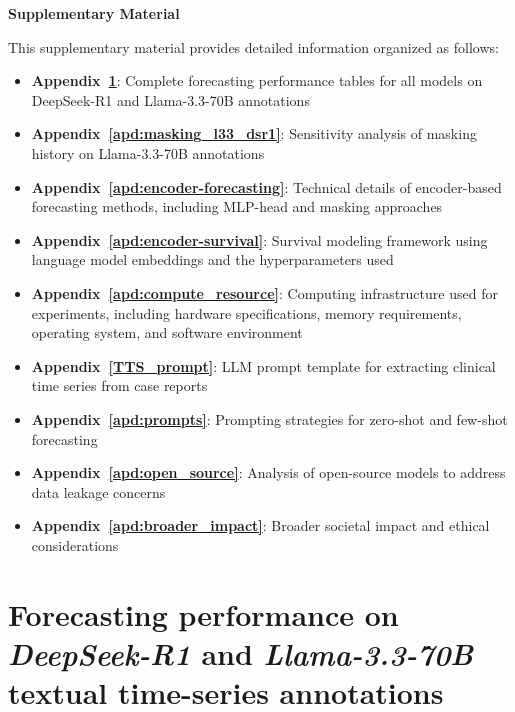 \setcounter{secnumdepth}{1}

\renewcommand{\thetable}{A\arabic{table}}
\setcounter{table}{0}

\begin{center}
    {\LARGE \bfseries Supplementary Material}
\end{center}
\vspace{1em} 

This supplementary material provides detailed information organized as follows:
\begin{itemize}
    \item \textbf{Appendix~\ref{apd:full_tables}}: Complete forecasting performance tables for all models on DeepSeek-R1 and Llama-3.3-70B annotations
    \item \textbf{Appendix~\ref{apd:masking_l33_dsr1}}: Sensitivity analysis of masking history on Llama-3.3-70B annotations
    \item \textbf{Appendix~\ref{apd:encoder-forecasting}}: Technical details of encoder-based forecasting methods, including MLP-head and masking approaches
    \item \textbf{Appendix~\ref{apd:encoder-survival}}: Survival modeling framework using language model embeddings and the hyperparameters used
    \item \textbf{Appendix~\ref{apd:compute_resource}}: Computing infrastructure used for experiments, including hardware specifications, memory requirements, operating system, and software environment
    \item \textbf{Appendix~\ref{TTS_prompt}}: LLM prompt template for extracting clinical time series from case reports
    \item \textbf{Appendix~\ref{apd:prompts}}: Prompting strategies for zero-shot and few-shot forecasting
    \item \textbf{Appendix~\ref{apd:open_source}}: Analysis of open-source models to address data leakage concerns
    \item \textbf{Appendix~\ref{apd:broader_impact}}: Broader societal impact and ethical considerations
\end{itemize}

\section{Forecasting performance on \textit{DeepSeek-R1} and \textit{Llama-3.3-70B} textual time-series annotations}
\label{apd:full_tables}

